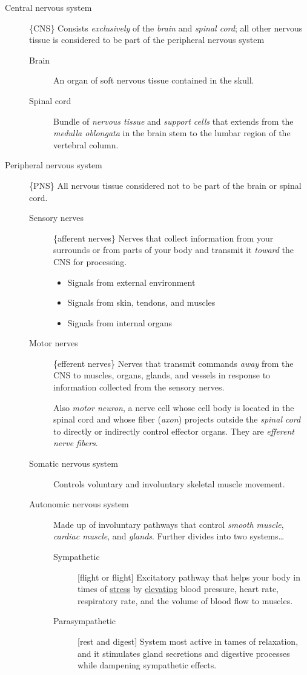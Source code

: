 \documentclass[11pt]{article}
\begin{document}
\begin{description}
\item[{Central nervous system}] \{CNS\} Consists \emph{exclusively} of the \emph{brain} and
\emph{spinal cord}; all other nervous tissue is considered to be part of the
peripheral nervous system

\begin{description}
\item[{Brain}] An organ of soft nervous tissue contained in the skull.
\item[{Spinal cord}] Bundle of \emph{nervous tissue} and \emph{support cells} that
extends from the \emph{medulla oblongata} in the brain stem to the lumbar
region of the vertebral column.
\end{description}

\item[{Peripheral nervous system}] \{PNS\} All nervous tissue considered not to
be part of the brain or spinal cord.

\begin{description}
\item[{Sensory nerves}] \{afferent nerves\} Nerves that collect information
from your surrounds or from parts of your body and transmit it
\emph{toward} the CNS for processing.
\begin{itemize}
\item Signals from external environment
\item Signals from skin, tendons, and muscles
\item Signals from internal organs
\end{itemize}
\item[{Motor nerves}] \{efferent nerves\} Nerves that transmit commands \emph{away}
from the CNS to muscles, organs, glands, and vessels in response
to information collected from the sensory nerves.

Also \emph{motor neuron}, a nerve cell whose cell body is located in the
spinal cord and whose fiber (\emph{axon}) projects outside the \emph{spinal
cord} to directly or indirectly control effector organs. They are
\emph{efferent nerve fibers}.
\item[{Somatic nervous system}] Controls voluntary and involuntary skeletal
muscle movement.
\item[{Autonomic nervous system}] Made up of involuntary pathways that
control \emph{smooth muscle}, \emph{cardiac muscle}, and \emph{glands}. Further divides
into two systems\dots{}
\begin{description}
\item[{Sympathetic}] [flight or flight] Excitatory pathway that
helps your body in times of \uline{stress} by \uline{elevating} blood
pressure, heart rate, respiratory rate, and the volume of
blood flow to muscles.
\item[{Parasympathetic}] [rest and digest] System most active in tames
of relaxation, and it stimulates gland secretions and
digestive processes while dampening sympathetic effects.
\end{description}
\end{description}


\end{description}
\end{document}
